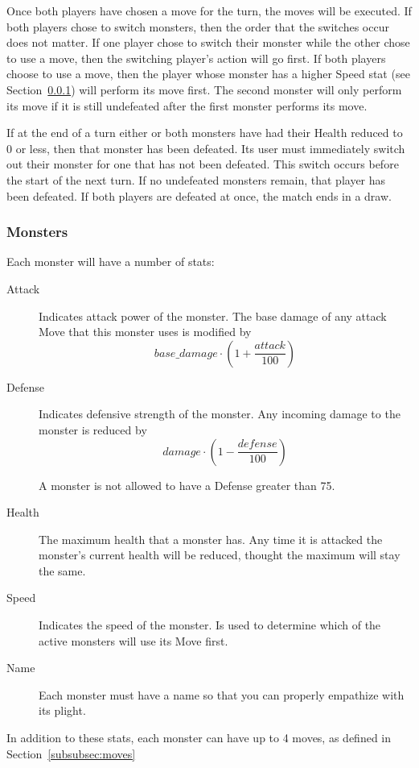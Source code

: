 \documentclass[11pt]{cselabheader}
\begin{document}
Once both players have chosen a move for the turn, the moves will be executed.
If both players chose to switch monsters, then the order that the switches occur
does not matter. If one player chose to switch their monster while the other chose
to use a move, then the switching player's action will go first. If both players
choose to use a move, then the player whose monster has a higher Speed stat (see
Section~\ref{subsubsec:monster}) will perform its move first. The second monster
will only perform its move if it is still undefeated after the first monster
performs its move.

If at the end of a turn either or both monsters have had their Health reduced to 0
or less, then that monster has been defeated. Its user must immediately switch out
their monster for one that has not been defeated. This switch occurs before the start
of the next turn. If no undefeated monsters remain, that player has been defeated.
If both players are defeated at once, the match ends in a draw.

\subsubsection{Monsters}
\label{subsubsec:monster}  
Each monster will have a number of stats:
\begin{description}
\item[Attack] Indicates attack power of the monster. The base damage of any attack
  Move that this monster uses is modified by $$base\_damage \cdot \left(1 +
  \frac{attack}{100}\right)$$
\item[Defense] Indicates defensive strength of the monster. Any incoming damage to
  the monster is reduced by $$damage \cdot \left(1 - \frac{defense}{100}\right)$$

  A monster is not allowed to have a Defense greater than 75.
\item[Health] The maximum health that a monster has. Any time it is attacked the
  monster's current health will be reduced, thought the maximum will stay the same.
\item[Speed] Indicates the speed of the monster. Is used to determine which of the
  active monsters will use its Move first.
\item[Name] Each monster must have a name so that you can properly empathize with
  its plight.
\end{description}


In addition to these stats, each monster can have up to 4 moves, as defined in
Section~\ref{subsubsec:moves}
\end{document}

